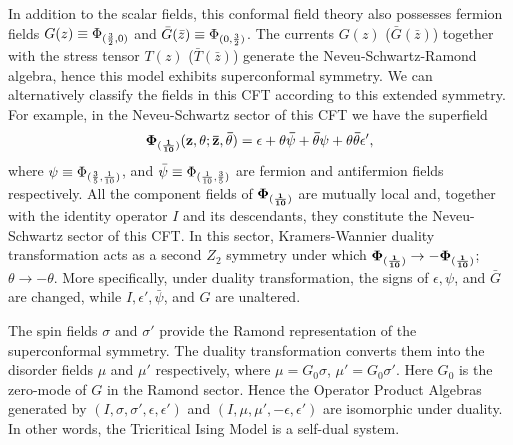 \documentclass[12pt]{article}
\begin{document}
In addition to the scalar fields, this conformal
field theory also possesses
fermion fields $G(z) \equiv \Phi_{({3\over2},0)}$ and $\bar{G}(\bar{z}) \equiv
\Phi_{(0,{3\over2})}$. The currents $G(z)$ ($\bar{G}(\bar{z})$)
together with the stress
tensor $T(z)$ ($\bar{T}(\bar{z})$) generate the Neveu-Schwartz-Ramond algebra,
hence this model exhibits superconformal symmetry. We can alternatively
classify the fields in this CFT according to this extended symmetry. For
example, in the Neveu-Schwartz sector of this CFT we have the superfield
$$\bf\Phi_{({1\over10})}(z,\theta;\bar{z},\bar{\theta}) =
\epsilon + \theta\bar\psi + \bar{\theta}\psi + \theta\bar{\theta}\epsilon',$$
where $\psi \equiv \Phi_{({3\over5},{1\over10})}$, and $\bar\psi \equiv
\Phi_{({1\over10},{3\over5})}$ are fermion and antifermion fields respectively.
All the component fields of $\bf\Phi_{({1\over10})}$ are mutually local and,
together with the identity operator $I$ and its descendants, they constitute
the Neveu-Schwartz sector of this CFT. In this sector, Kramers-Wannier duality
transformation
acts as a second $Z_2$ symmetry under which $\bf\Phi_{({1\over10})} \to
-\bf\Phi_{({1\over10})}$; $\theta \to -\theta$. More specifically, under
duality
transformation, the signs of $\epsilon, \psi$, and $\bar{G}$ are changed, while
$I, \epsilon', \bar\psi$, and $G$ are unaltered.

The spin fields $\sigma$ and $\sigma'$ provide the Ramond representation
of the superconformal symmetry. The duality transformation converts them
into the disorder fields $\mu$ and $\mu'$ respectively, where
$\mu = G_{0}\sigma$, $\mu' = G_0\sigma'$. Here $G_0$ is the zero-mode
of $G$ in the Ramond sector. Hence the Operator Product Algebras generated by
$(I, \sigma, \sigma', \epsilon, \epsilon')$ and
$(I, \mu, \mu', -\epsilon, \epsilon')$ are isomorphic under duality.
In other words, the Tricritical Ising Model is a self-dual system.


{} 

\end{document}
